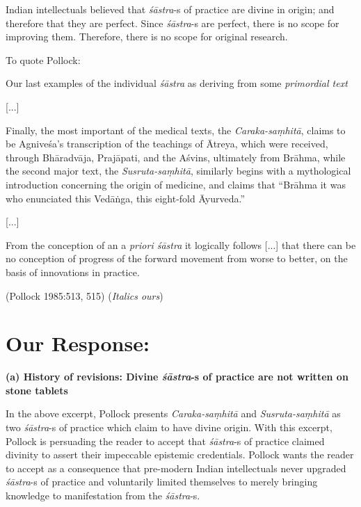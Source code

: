 Indian intellectuals believed that {{\sl śāstra}\relax}-s of practice are divine in origin; and therefore that they are perfect. Since {{\sl śāstra}\relax}-s are perfect, there is no scope for improving them. Therefore, there is no scope for original research.

To quote Pollock:
\begin{myquote}
Our last examples of the individual {\sl śāstra} as deriving from some {\sl primordial text}

[...]

Finally, the most important of the medical texts, the {\sl Caraka-saṃhitā}, claims to be Agniveśa's transcription of the teachings of Ātreya, which were received, through Bhāradvāja, Prajāpati, and the Aśvins, ultimately from Brāhma, while the second major text, the {\sl Susruta-saṃhitā}, similarly begins with a mythological introduction concerning the origin of medicine, and claims that ``Brāhma it was who enunciated this Vedāṅga, this eight-fold Āyurveda.''

[...]

\newpage

From the conception of an a {\sl priori śāstra} it logically follows [...] that there can be no conception of progress of the forward movement from worse to better, on the basis of innovations in practice. 

\hfill (Pollock 1985:513, 515) ({\sl Italics ours})
\end{myquote}

\section*{Our Response:}

{\bf (a) History of revisions: Divine {\sl\bfseries śāstra}-s of practice are not written on stone tablets}

In the above excerpt, Pollock presents {\sl Caraka-saṃhitā} and {\sl Susruta-saṃhitā} as two {\sl śāstra}-s of practice which claim to have divine origin.  With this excerpt, Pollock is persuading the reader to accept that {\sl śāstra}-s of practice claimed divinity to assert their impeccable epistemic credentials. Pollock wants the reader to accept as a consequence that pre-modern Indian intellectuals never upgraded {\sl śāstra}-s of practice and voluntarily limited themselves to merely bringing knowledge to manifestation from the {\sl śāstra}-s.

